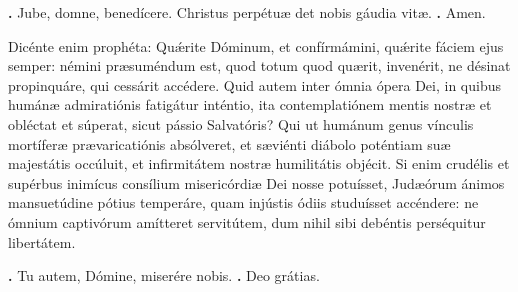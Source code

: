 \begin{small}
\textbf{\Vbar.} Jube, domne, benedícere.
Christus perpétuæ det nobis gáudia vitæ. \textbf{\Rbar.} Amen.
\end{small}


Dicénte enim prophéta: Qu\'{\ae}rite Dóminum, et confírmámini, qu\'{\ae}rite fáciem ejus semper: némini præsuméndum est, quod totum quod quærit, invenérit, ne désinat propinquáre, qui cessárit accédere. Quid autem inter ómnia ópera Dei, in quibus humánæ admiratiónis fatigátur inténtio, ita contemplatiónem mentis nostræ et obléctat et súperat, sicut pássio Salvatóris? Qui ut humánum genus vínculis mortíferæ prævaricatiónis absólveret, et sæviénti diábolo poténtiam suæ majestátis occúluit, et infirmitátem nostræ humilitátis objécit. Si enim crudélis et supérbus inimícus consílium misericórdiæ Dei nosse potuísset, Judæórum ánimos mansuetúdine pótius temperáre, quam injústis ódiis studuísset accéndere: ne ómnium captivórum amítteret servitútem, dum nihil sibi debéntis perséquitur libertátem.

\textbf{\Vbar.} Tu autem, Dómine, miserére nobis.
\textbf{\Rbar.} Deo grátias.


